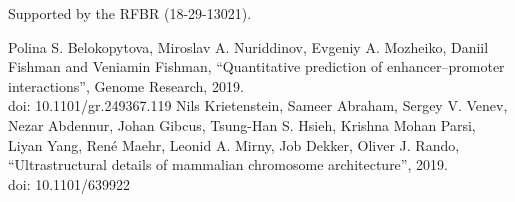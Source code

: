 \documentclass[conference]{IEEEtran}
\begin{document}
Supported by the RFBR (18-29-13021).

\begin{thebibliography}{00}
Polina S. Belokopytova, Miroslav A. Nuriddinov, Evgeniy A. Mozheiko, Daniil Fishman and Veniamin Fishman,
``Quantitative prediction of enhancer–promoter interactions'',
Genome Research, 2019.\\
doi: 10.1101/gr.249367.119
 Nils Krietenstein, Sameer Abraham, Sergey V. Venev, Nezar Abdennur, Johan Gibcus, Tsung-Han S. Hsieh, Krishna Mohan Parsi, Liyan Yang, René Maehr, Leonid A. Mirny, Job Dekker, Oliver J. Rando, ``Ultrastructural details of mammalian chromosome architecture'', 2019.\\ doi: 10.1101/639922 
\end{thebibliography}
\end{document}

